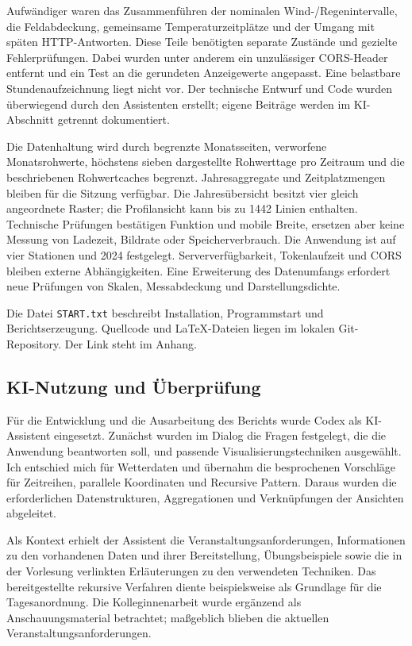 \documentclass[usegeometry=true]{scrartcl}
\begin{document}
Aufwändiger waren das Zusammenführen der nominalen Wind-/Regenintervalle,
die Feldabdeckung, gemeinsame Temperaturzeitplätze und der Umgang mit
späten HTTP-Antworten. Diese Teile benötigten separate Zustände und
gezielte Fehlerprüfungen. Dabei wurden unter anderem ein unzulässiger CORS-Header entfernt und
ein Test an die gerundeten Anzeigewerte angepasst.
Eine belastbare Stundenaufzeichnung liegt nicht vor. Der technische
Entwurf und Code wurden überwiegend durch den Assistenten erstellt;
eigene Beiträge werden im KI-Abschnitt getrennt dokumentiert.

Die Datenhaltung wird durch begrenzte Monatsseiten, verworfene Monatsrohwerte,
höchstens sieben dargestellte Rohwerttage pro Zeitraum und die beschriebenen
Rohwertcaches begrenzt. Jahresaggregate und Zeitplatzmengen bleiben für die Sitzung verfügbar.
Die Jahresübersicht besitzt vier gleich angeordnete Raster; die
Profilansicht kann bis zu 1442 Linien enthalten. Technische Prüfungen
bestätigen Funktion und mobile Breite, ersetzen aber keine Messung von
Ladezeit, Bildrate oder Speicherverbrauch. Die Anwendung ist auf vier
Stationen und 2024 festgelegt. Serververfügbarkeit, Tokenlaufzeit und
CORS bleiben externe Abhängigkeiten. Eine Erweiterung des Datenumfangs
erfordert neue Prüfungen von Skalen, Messabdeckung und Darstellungsdichte.

Die Datei \texttt{START.txt} beschreibt Installation, Programmstart und
Berichtserzeugung. Quellcode und LaTeX-Dateien liegen im lokalen
Git-Repository. Der Link steht im Anhang.

\subsection*{KI-Nutzung und Überprüfung}
Für die Entwicklung und die Ausarbeitung des Berichts wurde Codex als
KI-Assistent eingesetzt. Zunächst wurden im Dialog die Fragen festgelegt, die die Anwendung
beantworten soll, und passende Visualisierungstechniken ausgewählt. Ich entschied mich für Wetterdaten
und übernahm die besprochenen Vorschläge für Zeitreihen, parallele
Koordinaten und Recursive Pattern. Daraus wurden die erforderlichen
Datenstrukturen, Aggregationen und Verknüpfungen der Ansichten abgeleitet.

Als Kontext erhielt der Assistent die Veranstaltungsanforderungen,
Informationen zu den vorhandenen Daten und ihrer Bereitstellung,
Übungsbeispiele sowie die in der Vorlesung verlinkten Erläuterungen zu
den verwendeten Techniken. Das bereitgestellte rekursive Verfahren diente
beispielsweise als Grundlage für die Tagesanordnung. Die Kolleginnenarbeit
wurde ergänzend als Anschauungsmaterial betrachtet; maßgeblich blieben
die aktuellen Veranstaltungsanforderungen.
\end{document}
